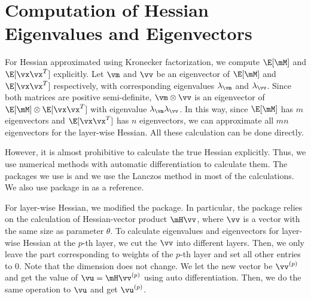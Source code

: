 \section{Computation of Hessian Eigenvalues and Eigenvectors}
\label{sec:appendix_eigencomp}
For Hessian approximated using Kronecker factorization, we compute $\E[\mM]$ and $\E[\vx\vx^T]$ explicitly. Let $\vm$ and $\vv$ be an eigenvector of $\E[\mM]$ and $\E[\vx\vx^T]$ respectively, with corresponding eigenvalues $\lambda_\vm$ and $\lambda_\vv$. Since both matrices are positive semi-definite, $\vm \otimes \vv$ is an eigenvector of $\E[\mM] \otimes \E[\vx\vx^T]$ with eigenvalue $\lambda_\vm\lambda_\vv$. In this way, since $\E[\mM]$ has $m$ eigenvectors and $\E[\vx\vx^T]$ has $n$ eigenvectors, we can approximate all $mn$ eigenvectors for the layer-wise Hessian. All these calculation can be done directly.

However, it is almost prohibitive to calculate the true Hessian explicitly. Thus, we use numerical methods with automatic differentiation \citep{paszke2017automatic} to calculate them. The packages we use is \citet{hessian-eigenthings} and we use the Lanczos method in most of the calculations. We also use package in \citet{yao2019pyhessian} as a reference.

For layer-wise Hessian, we modified the \citet{hessian-eigenthings} package. In particular, the package relies on the calculation of Hessian-vector product $\mH\vv$, where $\vv$ is a vector with the same size as parameter $\theta$. To calculate eigenvalues and eigenvectors for layer-wise Hessian at the $p$-th layer, we cut the $\vv$ into different layers. Then, we only leave the part corresponding to weights of the $p$-th layer and set all other entries to 0. Note that the dimension does not change. We let the new vector be $\vv^{(p)}$ and get the value of $\vu = \mH\vv^{(p)}$ using auto differentiation. Then, we do the same operation to $\vu$ and get $\vu^{(p)}$.